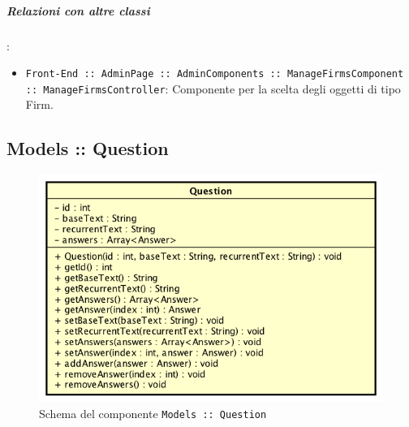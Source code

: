 \documentclass[../ManualeSviluppatore_v2.0.0.tex]{subfiles}
\begin{document}
		\subparagraph{Relazioni con altre classi}:
		      \begin{itemize}
		      	\item \texttt{Front-End :: AdminPage :: AdminComponents :: ManageFirmsComponent :: ManageFirmsController}: Componente per la scelta degli oggetti di tipo Firm.
		      \end{itemize}

	\newpage
	\subsection{Models :: Question}
	\begin{figure}[!h]
		\centering
		\includegraphics[scale=0.6]{Architettura/Front-End/Models/Question.png}
		\caption{Schema del componente \texttt{Models :: Question}}
	\end{figure}
\end{document}
